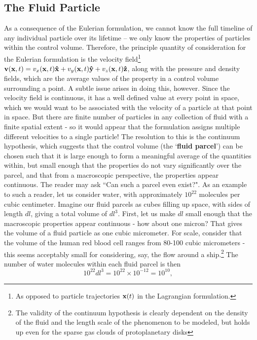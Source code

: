 \subsection{The Fluid Particle}
As a consequence of the Eulerian formulation, we cannot know the full timeline of any individual particle over its lifetime -- we only know the properties of particles within the control volume. Therefore, the principle quantity of consideration for the Eulerian formulation is the {velocity field}\footnote{As opposed to particle trajectories $\mathbf{x}(t)$ in the Lagrangian formulation.} $\mathbf{v}(\mathbf{x},t) = v_x(\mathbf{x},t) \mathbf{\hat{x}} + v_y (\mathbf{x},t)\mathbf{\hat{y}} + v_z(\mathbf{x},t) \mathbf{\hat{z}}$, along with the pressure and density fields, which are the average values of the property in a control volume surrounding a point. A subtle issue arises in doing this, however. Since the velocity field is continuous, it has a well defined value at every point in space, which we would want to be associated with the velocity of a particle at that point in space. But there are finite number of particles in any collection of fluid with a finite spatial extent - so it would appear that the formulation assigns multiple different velocities to a single particle! The resolution to this is the continuum hypothesis, which suggests that the control volume (the `{\bf fluid parcel}') can be chosen such that it is large enough to form a meaningful average of the quantities within, but small enough that the properties do not vary significantly over the parcel, and that from a macroscopic perspective, the properties appear continuous. 
The reader may ask ``Can such a  parcel even exist?". As an example to such a reader, let us consider water, with approximately $10^{22}$ molecules per cubic centimeter. Imagine our fluid parcels as cubes filling up space, with sides of length $dl$, giving a total volume of $dl^3$. First, let us make $dl$ small enough that the macroscopic properties appear continuous - how about one micron? That gives the volume of a fluid particle as one cubic micrometer. For scale, consider that the volume of the human red blood cell ranges from 80-100 cubic micrometers\cite{Fischer1983} - this seems acceptably small for considering, say, the flow around a ship.\footnote{The validity of the continuum hypothesis is clearly dependent on the density of the fluid and the length scale of the phenomenon to be modeled, but holds up even for the sparse gas clouds of protoplanetary disks} The number of water molecules within each fluid parcel is then 
\begin{equation}
10^{22}dl^3 = 10^{22} \times 10^{-12} = 10^{10},
\end{equation}   

